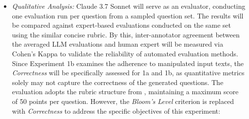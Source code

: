 \begin{itemize}
\begin{itemize}
        \item \textit{Qualitative Analysis:} Claude 3.7 Sonnet will serve as an evaluator, conducting one evaluation run per question from a sampled question set. The results will be compared against expert-based evaluations conducted on the same set using the similar concise rubric. By this, inter-annotator agreement between the averaged LLM evaluations and human expert will be measured via Cohen's Kappa to validate the reliability of automated evaluation methods. Since Experiment 1b examines the adherence to manipulated input texts, the \textit{Correctness} will be specifically assessed for 1a and 1b, as quantitative metrics solely may not capture the correctness of the generated questions. The evaluation adopts the rubric structure from \cite{mi_comparative_2024}, maintaining a maximum score of 50 points per question. However, the \textit{Bloom's Level} criterion is replaced with \textit{Correctness} to address the specific objectives of this experiment:


\end{itemize}
\end{itemize}
